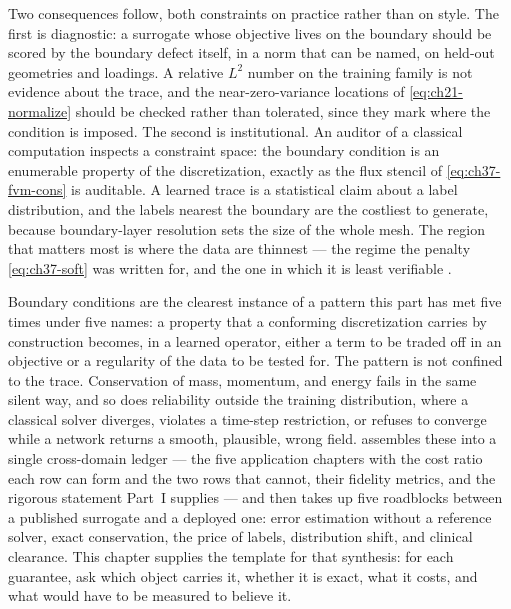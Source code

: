 Two consequences follow, both constraints on practice rather than on style. The first is
diagnostic: a surrogate whose objective lives on the boundary should be scored by the boundary
defect itself, in a norm that can be named, on held-out geometries and loadings. A relative
$L^2$ number on the training family is not evidence about the trace, and the near-zero-variance
locations of \eqref{eq:ch21-normalize} should be checked rather than tolerated, since they mark where
the condition is imposed. The second is institutional. An auditor of a classical computation
inspects a constraint space: the boundary condition is an enumerable property of the discretization,
exactly as the flux stencil of \eqref{eq:ch37-fvm-cons} is auditable. A
learned trace is a statistical claim about a label distribution, and the labels nearest the boundary
are the costliest to generate, because boundary-layer resolution sets the size of the whole mesh. The
region that matters most is where the data are thinnest --- the regime the penalty
\eqref{eq:ch37-soft} was written for, and the one in which it is least verifiable
.


Boundary conditions are the clearest instance of a pattern this part has met five times under five
names: a property that a conforming discretization carries by construction becomes, in a learned
operator, either a term to be traded off in an objective or a regularity of the data to be tested
for. The pattern is not confined to the trace. Conservation of mass, momentum, and energy fails in
the same silent way, and so does reliability outside the training distribution, where a classical
solver diverges, violates a time-step restriction, or refuses to converge while a network returns a
smooth, plausible, wrong field. 
assembles these into a single cross-domain ledger --- the five application chapters with the cost
ratio each row can form and the two rows that cannot, their fidelity metrics, and the rigorous
statement Part~I supplies --- and then takes up five roadblocks between a published surrogate and a
deployed one: error estimation without a reference solver, exact conservation, the price of labels,
distribution shift, and clinical clearance. This chapter supplies the template for that synthesis: for each guarantee, ask
which object carries it, whether it is exact, what it costs, and what would have to be measured to
believe it.
